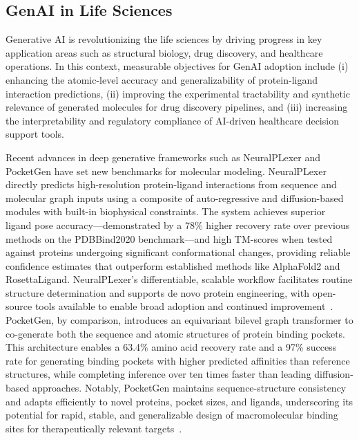 \documentclass[sigconf]{acmart}
\begin{document}
\subsection{GenAI in Life Sciences}

Generative AI is revolutionizing the life sciences by driving progress in key application areas such as structural biology, drug discovery, and healthcare operations. In this context, measurable objectives for GenAI adoption include (i) enhancing the atomic-level accuracy and generalizability of protein-ligand interaction predictions, (ii) improving the experimental tractability and synthetic relevance of generated molecules for drug discovery pipelines, and (iii) increasing the interpretability and regulatory compliance of AI-driven healthcare decision support tools.

Recent advances in deep generative frameworks such as NeuralPLexer and PocketGen have set new benchmarks for molecular modeling. NeuralPLexer directly predicts high-resolution protein-ligand interactions from sequence and molecular graph inputs using a composite of auto-regressive and diffusion-based modules with built-in biophysical constraints. The system achieves superior ligand pose accuracy---demonstrated by a 78\% higher recovery rate over previous methods on the PDBBind2020 benchmark---and high TM-scores when tested against proteins undergoing significant conformational changes, providing reliable confidence estimates that outperform established methods like AlphaFold2 and RosettaLigand. NeuralPLexer’s differentiable, scalable workflow facilitates routine structure determination and supports de novo protein engineering, with open-source tools available to enable broad adoption and continued improvement~\cite{ref4}. PocketGen, by comparison, introduces an equivariant bilevel graph transformer to co-generate both the sequence and atomic structures of protein binding pockets. This architecture enables a 63.4\% amino acid recovery rate and a 97\% success rate for generating binding pockets with higher predicted affinities than reference structures, while completing inference over ten times faster than leading diffusion-based approaches. Notably, PocketGen maintains sequence-structure consistency and adapts efficiently to novel proteins, pocket sizes, and ligands, underscoring its potential for rapid, stable, and generalizable design of macromolecular binding sites for therapeutically relevant targets~\cite{ref5}.
\end{document}
